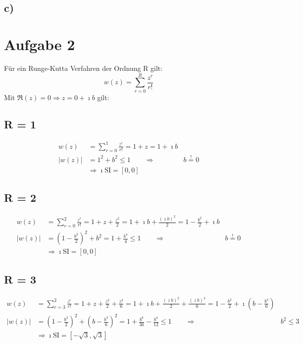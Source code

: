 \documentclass[10pt,oneside,a4paper]{scrartcl}
\begin{document}
        \subsection*{c)}
    
    \section*{Aufgabe 2}
       Für ein Runge-Kutta Verfahren der Ordnung R gilt:
       \begin{equation*}
           w(z) = \sum\limits_{r=0}^R \frac{z^r}{r!}
       \end{equation*}
       Mit $\Re(z) = 0 \Rightarrow z = 0 + \imath b$ gilt:
       \subsection*{R = 1}
           \begin{align*}
               w(z) &= \sum\limits_{r=0}^1 \frac{z^r}{r!}
               = 1 + z = 1 + \imath b\\
               |w(z)| &= 1^2 + b^2 \leq 1 \qquad \Rightarrow  &b \stackrel{!}{=}
               0\\
               &\Rightarrow \imath\text{SI} = [0, 0]
           \end{align*}
      \subsection*{R = 2}
           \begin{align*}
               w(z) &= \sum\limits_{r=0}^2 \frac{z^r}{r!}
               = 1 + z + \frac{z^2}{2} = 1 + \imath b + \frac{(\imath b)^2}{2}
               = 1 - \frac{b^2}{2} + \imath b\\
               |w(z)| &= (1 - \frac{b^2}{2})^2 + b^2 = 1 + \frac{b^4}{4} \leq 1
               \qquad \Rightarrow  &b \stackrel{!}{=} 0\\
               &\Rightarrow \imath\text{SI} = [0, 0]
           \end{align*}
      \subsection*{R = 3}
           \begin{align*}
               w(z) &= \sum\limits_{r=3}^2 \frac{z^r}{r!}
               = 1 + z + \frac{z^2}{2} + \frac{z^3}{6} = 1 + \imath b +
               \frac{(\imath b)^2}{2} + \frac{(\imath b)^3}{6} = 1 -
               \frac{b^2}{2} + \imath (b - \frac{b^3}{6})\\
               |w(z)| &= (1 - \frac{b^2}{2})^2 + (b - \frac{b^3}{6})^2 = 1 +
               \frac{b^6}{36} - \frac{b^4}{12} \leq 1 \qquad \Rightarrow  &b^2
               \leq 3\\
               &\Rightarrow \imath\text{SI} = [-\sqrt{3}, \sqrt{3}]
           \end{align*}
\end{document}
